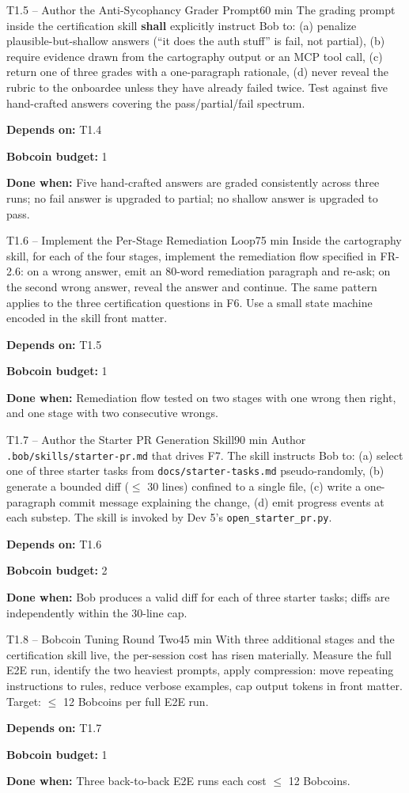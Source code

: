 \documentclass[11pt,letterpaper]{article}
\newcommand{\acceptance}[1]{\par\smallskip\textcolor{ibmgreen}{\textbf{Done when:}} #1}
\newcommand{\depends}[1]{\par\smallskip\textcolor{ibmorange}{\textbf{Depends on:}} #1}
\newcommand{\bobcost}[1]{\par\smallskip\textcolor{ibmaccent}{\textbf{Bobcoin budget:}} #1}
\newcommand{\shall}{\textbf{shall}}
\begin{document}
\begin{task}{T1.5 -- Author the Anti-Sycophancy Grader Prompt}{60 min}
The grading prompt inside the certification skill \shall{} explicitly instruct Bob to: (a) penalize plausible-but-shallow answers (``it does the auth stuff'' is fail, not partial), (b) require evidence drawn from the cartography output or an MCP tool call, (c) return one of three grades with a one-paragraph rationale, (d) never reveal the rubric to the onboardee unless they have already failed twice. Test against five hand-crafted answers covering the pass/partial/fail spectrum.
\depends{T1.4}
\bobcost{1}
\acceptance{Five hand-crafted answers are graded consistently across three runs; no fail answer is upgraded to partial; no shallow answer is upgraded to pass.}
\end{task}

\begin{task}{T1.6 -- Implement the Per-Stage Remediation Loop}{75 min}
Inside the cartography skill, for each of the four stages, implement the remediation flow specified in FR-2.6: on a wrong answer, emit an 80-word remediation paragraph and re-ask; on the second wrong answer, reveal the answer and continue. The same pattern applies to the three certification questions in F6. Use a small state machine encoded in the skill front matter.
\depends{T1.5}
\bobcost{1}
\acceptance{Remediation flow tested on two stages with one wrong then right, and one stage with two consecutive wrongs.}
\end{task}

\begin{task}{T1.7 -- Author the Starter PR Generation Skill}{90 min}
Author \texttt{.bob/skills/starter-pr.md} that drives F7. The skill instructs Bob to: (a) select one of three starter tasks from \texttt{docs/starter-tasks.md} pseudo-randomly, (b) generate a bounded diff ($\leq$ 30 lines) confined to a single file, (c) write a one-paragraph commit message explaining the change, (d) emit progress events at each substep. The skill is invoked by Dev 5's \texttt{open\_starter\_pr.py}.
\depends{T1.6}
\bobcost{2}
\acceptance{Bob produces a valid diff for each of three starter tasks; diffs are independently within the 30-line cap.}
\end{task}

\begin{task}{T1.8 -- Bobcoin Tuning Round Two}{45 min}
With three additional stages and the certification skill live, the per-session cost has risen materially. Measure the full E2E run, identify the two heaviest prompts, apply compression: move repeating instructions to rules, reduce verbose examples, cap output tokens in front matter. Target: $\leq$ 12 Bobcoins per full E2E run.
\depends{T1.7}
\bobcost{1}
\acceptance{Three back-to-back E2E runs each cost $\leq$ 12 Bobcoins.}
\end{task}
\end{document}
